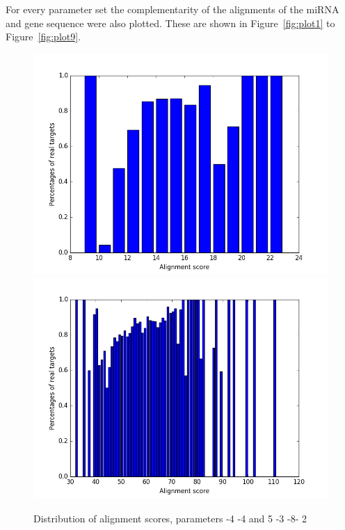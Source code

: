 \documentclass[12pt]{article}
\begin{document}
For every parameter set the complementarity of the alignments of the miRNA and gene sequence were also plotted. These are shown in Figure~\ref{fig:plot1} to Figure~\ref{fig:plot9}.

\begin{figure}
\includegraphics[scale=0.35]{results/plot_scores-4-4.png}
\includegraphics[scale=0.35]{results/plot_scores5-3-8-2.png}
\caption{Distribution of alignment scores, parameters -4 -4 and 5 -3 -8- 2}
\label{fig:distribution}
\end{figure}
\end{document}
